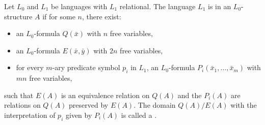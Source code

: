 Let $L_0$ and $L_1$ be languages with $L_1$ relational. The language $L_1$ is  in an $L_0$-structure $A$ if for some $n$, there exist:
\begin{itemize}
\item an $L_0$-formula $Q(\bar{x})$ with $n$ free variables,
\item an $L_0$-formula $E(\bar{x}, \bar{y})$ with $2n$ free variables,
\item for every $m$-ary predicate symbol $p_i$ in $L_1$, an $L_0$-formula $P_i(\bar{x}_1, \ldots, \bar{x}_m)$ with $mn$ free variables,
\end{itemize}
such that $E(A)$ is an equivalence relation on $Q(A)$ and the $P_i(A)$ are relations on $Q(A)$ preserved by $E(A)$. The domain $Q(A)/E(A)$ with the interpretation of $p_i$ given by $P_i(A)$ is called a .
